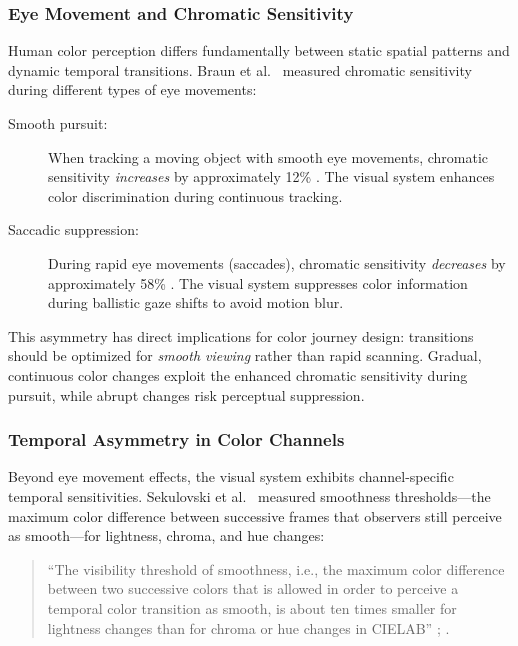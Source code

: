 \subsubsection{Eye Movement and Chromatic Sensitivity}

Human color perception differs fundamentally between static spatial patterns and dynamic temporal transitions. Braun et al.\ \citeyearpar{braun2017} measured chromatic sensitivity during different types of eye movements:

\begin{description}
    \item[Smooth pursuit:] When tracking a moving object with smooth eye movements, chromatic sensitivity \emph{increases} by approximately 12\% \citep{braun2017}. The visual system enhances color discrimination during continuous tracking.
    
    \item[Saccadic suppression:] During rapid eye movements (saccades), chromatic sensitivity \emph{decreases} by approximately 58\% \citep{braun2017}. The visual system suppresses color information during ballistic gaze shifts to avoid motion blur.
\end{description}

This asymmetry has direct implications for color journey design: transitions should be optimized for \emph{smooth viewing} rather than rapid scanning. Gradual, continuous color changes exploit the enhanced chromatic sensitivity during pursuit, while abrupt changes risk perceptual suppression.

\subsubsection{Temporal Asymmetry in Color Channels}

Beyond eye movement effects, the visual system exhibits channel-specific temporal sensitivities. Sekulovski et al.\ \citeyearpar{sekulovski2007} measured smoothness thresholds—the maximum color difference between successive frames that observers still perceive as smooth—for lightness, chroma, and hue changes:

\begin{quote}
``The visibility threshold of smoothness, i.e., the maximum color difference between two successive colors that is allowed in order to perceive a temporal color transition as smooth, is about ten times smaller for lightness changes than for chroma or hue changes in CIELAB'' \citep[p.~530, citing][]{kong2021}; \citep{sekulovski2007}.
\end{quote}

